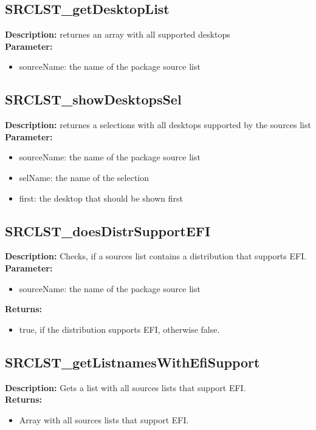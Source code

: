 \subsection{SRCLST\_getDesktopList}
\textbf{Description:} returnes an array with all supported desktops\\
\textbf{Parameter:}
\begin{itemize}
\item sourceName: the name of the package source list
\end{itemize}

\subsection{SRCLST\_showDesktopsSel}
\textbf{Description:} returnes a selections with all desktops supported by the sources list\\
\textbf{Parameter:}
\begin{itemize}
\item sourceName: the name of the package source list
\item selName: the name of the selection
\item first: the desktop that should be shown first
\end{itemize}

\subsection{SRCLST\_doesDistrSupportEFI}
\textbf{Description:} Checks, if a sources list contains a distribution that supports EFI.\\
\textbf{Parameter:}
\begin{itemize}
\item sourceName: the name of the package source list
\end{itemize}
\textbf{Returns:}
\begin{itemize}
\item true, if the distribution supports EFI, otherwise false.
\end{itemize}

\subsection{SRCLST\_getListnamesWithEfiSupport}
\textbf{Description:} Gets a list with all sources lists that support EFI.\\
\textbf{Returns:}
\begin{itemize}
\item Array with all sources lists that support EFI.
\end{itemize}

